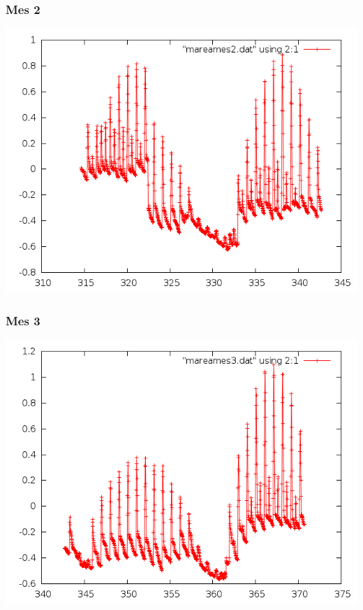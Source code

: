 \documentclass[10pt]{article}
\begin{document}
\subsubsection{Mes 2}
\includegraphics[scale=0.6]{mareames2.png}

\subsubsection{Mes 3}
\includegraphics[scale=0.6]{mareames3.png}

\newpage
\end{document}
